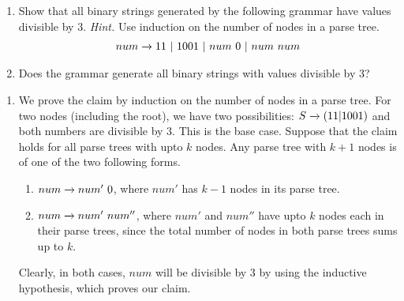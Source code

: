 \begin{exercise}\label{ex:020205}
    \begin{enumerate}[label=\alph*)]
        \item Show that all binary strings generated by the following grammar 
        have values divisible by 3. \textit{Hint.} Use induction on the number 
        of nodes in a parse tree.
        \begin{align*}
            num \xrightarrow{} 11\ |\ 1001\ |\ num\ 0\ |\ num\ num
        \end{align*}
        \item Does the grammar generate all binary strings with values divisible 
        by 3?
    \end{enumerate}
\end{exercise}
\begin{solution}\label{sol:ex020205}
    \begin{enumerate}[label=\alph*)]
        \item We prove the claim by induction on the number of nodes in a parse
        tree. For two nodes (including the root), we have two possibilities: 
        $S \xrightarrow{} \left( 11|1001 \right)$ and both numbers are divisible by 3. This is 
        the base case. Suppose that the claim holds for all parse trees with upto
        $k$ nodes. Any parse tree with $k + 1$ nodes is of one of the two following
        forms.
        \begin{enumerate}[label=\roman*.]
            \item $num \xrightarrow{} num'\ 0$, where $num'$ has $k - 1$ nodes in its parse 
            tree.
            \item $num \xrightarrow{} num'\ num''$, where $num'$ and $num''$ have upto $k$ 
            nodes each in their parse trees, since the total number of nodes in 
            both parse trees sums up to $k$.
        \end{enumerate} 
        Clearly, in both cases, $num$ will be divisible by 3 by using the 
        inductive hypothesis, which proves our claim.
    \end{enumerate}
\end{solution}